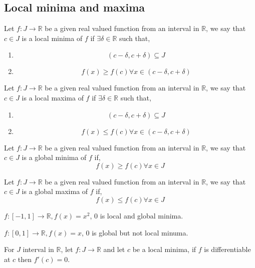 \documentclass[11pt,a4paper]{colorart}
\def\d{{\delta}}
\def\R{\mathbb{R}}
\def\ra{\rightarrow}
\begin{document}
\subsection{Local minima and maxima}

\begin{definition}
	Let $f:J\ra\R$ be a given real valued function from an interval in $\R$, we say that $c\in J$ is a local minima of $f$ if $\exists \d \in \R$ such that,
	\begin{enumerate}
		\item \[ (c-\d,c+\d) \subseteq J \]
		\item \[ f(x) \geq f(c) \forall x \in (c-\d,c+\d) \]
	\end{enumerate}
\end{definition}

\begin{definition}
	Let $f:J\ra\R$ be a given real valued function from an interval in $\R$, we say that $c\in J$ is a local maxima of $f$ if $\exists \d \in \R$ such that,
	\begin{enumerate}
		\item \[ (c-\d,c+\d) \subseteq J \]
		\item \[ f(x) \leq f(c) \forall x \in (c-\d,c+\d) \]
	\end{enumerate}
\end{definition}

\begin{definition}
	Let $f:J\ra\R$ be a given real valued function from an interval in $\R$, we say that $c\in J$ is a global minima of $f$ if,
	\[ f(x) \geq f(c) \forall x \in J \]
\end{definition}

\begin{definition}
	Let $f:J\ra\R$ be a given real valued function from an interval in $\R$, we say that $c\in J$ is a global maxima of $f$ if,
	\[ f(x) \leq f(c) \forall x \in J \]
\end{definition}

\begin{example}
	$f:[-1,1]\ra\R, f(x) = x^2$, 0 is local and global minima.
\end{example}

\begin{example}
	$f:[0,1]\ra\R, f(x)=x$, 0 is global but not local minuma.
\end{example}

\begin{theorem}
	For $J$ interval in $\R$, let $f:J\ra\R$ and let $c$ be a local minima, if $f$ is differentiable at $c$ then $f'(c)=0$.
\end{theorem}
\end{document}

